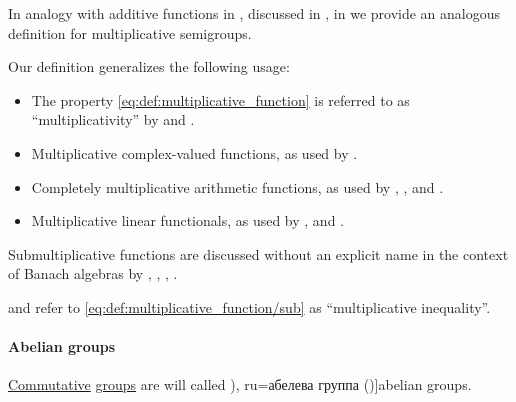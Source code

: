 \begin{remark}\label{rem:multiplicative_function_terminology}
  In analogy with additive functions in , discussed in , in  we provide an analogous definition for multiplicative semigroups.

  Our definition generalizes the following usage:
  \begin{itemize}
    \item The property \eqref{eq:def:multiplicative_function} is referred to as \enquote{multiplicativity} by  and .

    \item Multiplicative complex-valued functions, as used by .

    \item Completely multiplicative arithmetic functions, as used by ,
    ,
     and .

    \item Multiplicative linear functionals, as used by ,
     and .
  \end{itemize}

  Submultiplicative functions are discussed without an explicit name in the context of Banach algebras by
  ,
  ,
  ,
  .

   and  refer to \eqref{eq:def:multiplicative_function/sub} as \enquote{multiplicative inequality}.
\end{remark}

\paragraph{Abelian groups}

\begin{definition}\label{def:abelian_group}
  \hyperref[def:binary_operation/commutative]{Commutative} \hyperref[def:group]{groups} are will called \term[bg=абелева группа (\cite[390]{Обрешков1962ВисшаАлгебра}), ru=абелева группа (\cite[def. 1.1.1]{Винберг2014КурсАлгебры})]{abelian groups}.
\end{definition}

